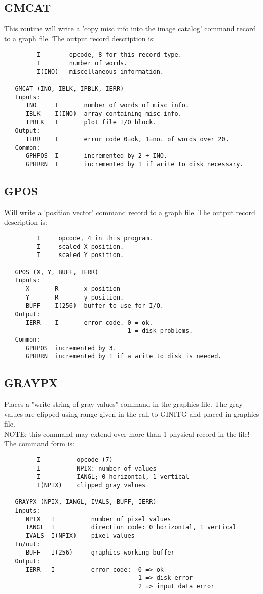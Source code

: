 \subsection{GMCAT}
This routine will write a 'copy misc info into the image catalog'
command record to a graph file.
The output record description is:
\begin{verbatim}
         I        opcode, 8 for this record type.
         I        number of words.
         I(INO)   miscellaneous information.

   GMCAT (INO, IBLK, IPBLK, IERR)
   Inputs:
      INO     I       number of words of misc info.
      IBLK    I(INO)  array containing misc info.
      IPBLK   I       plot file I/O block.
   Output:
      IERR    I       error code 0=ok, 1=no. of words over 20.
   Common:
      GPHPOS  I       incremented by 2 + INO.
      GPHRRN  I       incremented by 1 if write to disk necessary.

\end{verbatim}

\subsection{GPOS}
Will write a 'position vector' command record to a graph file.
The output record description is:
\begin{verbatim}
         I     opcode, 4 in this program.
         I     scaled X position.
         I     scaled Y position.

   GPOS (X, Y, BUFF, IERR)
   Inputs:
      X       R       x position
      Y       R       y position.
      BUFF    I(256)  buffer to use for I/O.
   Output:
      IERR    I       error code. 0 = ok.
                                  1 = disk problems.
   Common:
      GPHPOS  incremented by 3.
      GPHRRN  incremented by 1 if a write to disk is needed.
\end{verbatim}

\subsection{GRAYPX}
Places a "write string of gray values" command in the
graphics file.  The gray values are clipped using range given in the
call to GINITG and placed in graphics file.  \\
NOTE: this command may extend over more than 1 physical record
in the file!
The command form is:
\begin{verbatim}
         I          opcode (7)
         I          NPIX: number of values
         I          IANGL; 0 horizontal, 1 vertical
         I(NPIX)    clipped gray values

   GRAYPX (NPIX, IANGL, IVALS, BUFF, IERR)
   Inputs:
      NPIX   I          number of pixel values
      IANGL  I          direction code: 0 horizontal, 1 vertical
      IVALS  I(NPIX)    pixel values
   In/out:
      BUFF   I(256)     graphics working buffer
   Output:
      IERR   I          error code:  0 => ok
                                     1 => disk error
                                     2 => input data error
\end{verbatim}


